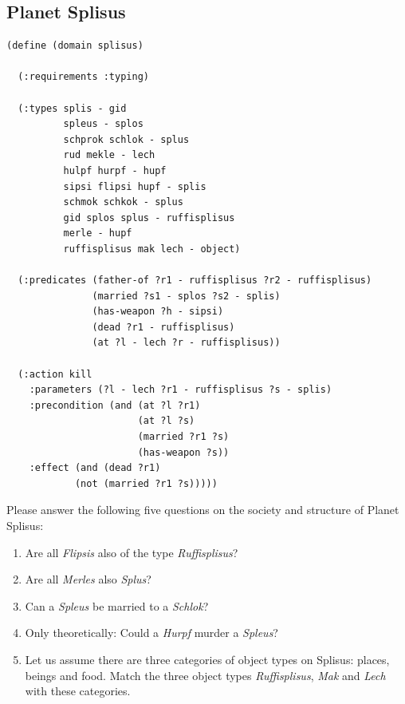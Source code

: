 \documentclass[runningheads]{llncs}
\begin{document}
\subsection{Planet Splisus}
\label{splisus}
\begin{verbatim}
(define (domain splisus) 

  (:requirements :typing)

  (:types splis - gid
          spleus - splos
          schprok schlok - splus
          rud mekle - lech
          hulpf hurpf - hupf
          sipsi flipsi hupf - splis
          schmok schkok - splus
          gid splos splus - ruffisplisus
          merle - hupf
          ruffisplisus mak lech - object)

  (:predicates (father-of ?r1 - ruffisplisus ?r2 - ruffisplisus)
               (married ?s1 - splos ?s2 - splis)
               (has-weapon ?h - sipsi)
               (dead ?r1 - ruffisplisus)
               (at ?l - lech ?r - ruffisplisus))

  (:action kill
    :parameters (?l - lech ?r1 - ruffisplisus ?s - splis)
    :precondition (and (at ?l ?r1)
                       (at ?l ?s)
                       (married ?r1 ?s)
                       (has-weapon ?s))
    :effect (and (dead ?r1)
            (not (married ?r1 ?s)))))
\end{verbatim}

Please answer the following five questions on the society and
structure of Planet Splisus:
\begin{enumerate}
\item Are all \emph{Flipsis} also of the type \emph{Ruffisplisus}?
\item Are all \emph{Merles} also \emph{Splus}?
\item Can a \emph{Spleus} be married to a \emph{Schlok}?
\item Only theoretically: Could a \emph{Hurpf} murder a \emph{Spleus}?
\item Let us assume there are three categories of object types on
  Splisus: places, beings and food. Match the three object types
  \emph{Ruffisplisus}, \emph{Mak} and \emph{Lech} with these
  categories.
\end{enumerate}
\end{document}
